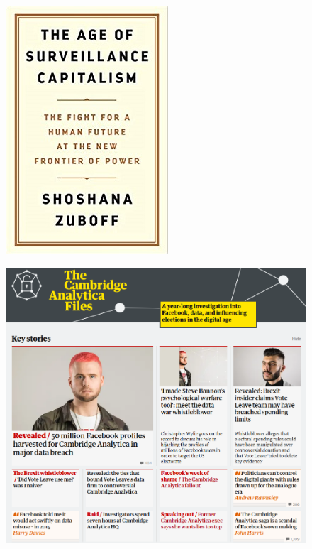 \begin{frame}
  \begin{figure}
    \includegraphics[height=0.8\textheight]{fig/The-Age-of-Surveillance-Capitalism.jpg}
  \end{figure}
\end{frame}

\begin{frame}
  \begin{figure}
    \includegraphics[width=\columnwidth]{fig/analytica.png}
  \end{figure}
\end{frame}

